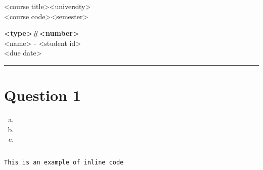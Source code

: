 \documentclass[fleqn, 12pt]{article}
\newcommand{\university}{<university>}
\newcommand{\name}{<name>}
\newcommand{\studentNumber}{<student id>}
\newcommand{\semester}{<semester>}
\newcommand{\assignmentType}{<type>}
\newcommand{\assignemntNumber}{<number>}
\newcommand{\dueDate}{<due date>}
\newcommand{\courseCode}{<course code>}
\newcommand{\courseTitle}{<course title>}
\newcommand{\code}[1]{\colorbox{codegray}{\texttt{#1}}}
\newcommand{\codefile}{\inputminted}
\newcommand{\makeheader}{
    \noindent
    \courseTitle \hfill \university\\
    \courseCode \hfill \semester
    \begin{center}
        \textbf{\assignmentType \#\assignemntNumber}\\
        \name \hspace{1pt} - \studentNumber\\
        \dueDate\\
    \end{center}
    \vspace{6pt}
    \hrule
}
\begin{document}
\thispagestyle{firstpage}
\makeheader

\section*{Question 1}

\begin{enumerate}[a)]
    \item
    \item
    \item
\end{enumerate}

\codefile{javascript}{sample.js}
\code{This is an example of inline code}
\end{document}
